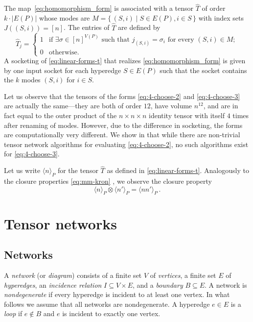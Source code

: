 \documentclass{toc}
\newcommand{\bra}{\ensuremath{\langle}}
\newcommand{\ket}{\ensuremath{\rangle}}
\begin{document}
The map~\eqref{eq:homomorphism_form} is associated with a tensor $\hat{T}$ of 
order $k \cdot |E(P)|$ whose modes are
%
%
$M = \{\,(S,i) \mid S \in E(P), i \in S \,\}$ with index sets
%
$J((S,i)) = [n]$. The entries of $\hat{T}$ are defined by
\begin{equation}
\label{eq:linear-forms-t}
\hat{T}_j=
\begin{cases}
1 & \text{if $\exists \sigma \in [n]^{V(P)}$ such that $j_{(S,i)}=\sigma_i$ for every $(S,i) \in M$};\\
0 & \text{otherwise}.
\end{cases}
\end{equation}
A socketing of \eqref{eq:linear-forms-t} that realizes \eqref{eq:homomorphism_form} is given by one input socket for each hyperedge $S \in E(P)$ such that
the socket contains the $k$ modes $(S,i)$ for $i \in S$.

Let us observe that the tensors of the forms \eqref{eq:4-choose-2} and
\eqref{eq:4-choose-3} are actually the same---they are both of order
$12$, have volume $n^{12}$, and are in fact equal to the outer product
of the $n \times n \times n$ identity tensor with itself $4$ times
after renaming of modes.  However, due to the difference in
socketing, the forms are computationally very different.
We show in  that while there
are non-trivial tensor network algorithms for evaluating
\eqref{eq:4-choose-2}, no such algorithms exist for
\eqref{eq:4-choose-3}.

Let us write $\bra n\ket_P$
for the tensor $\hat{T}$ as defined
in \eqref{eq:linear-forms-t}. Analogously to the closure
properties \eqref{eq:mm-kron} , we observe the
closure property
\begin{equation}
  \label{eq:binom-kron}
  \bra n\ket_P \otimes \bra n'\ket_P = \bra nn'\ket_P\,.
\end{equation}

\section{Tensor networks}
\label{sec:tensor network defs}

\subsection{Networks}

A \emph{network} (or \emph{diagram})
consists of a finite set $V$ of \emph{vertices},
a finite set $E$ of \emph{hyperedges},
an \emph{incidence relation} $I\subseteq V\times E$, and
a \emph{boundary} $B\subseteq E$.
A network is \emph{nondegenerate} if every hyperedge is incident to at least
one vertex. In what follows we assume that all networks are nondegenerate.
A hyperedge $e\in E$ is a \emph{loop} if $e\notin B$ and $e$ is incident
to exactly one vertex.
\end{document}
